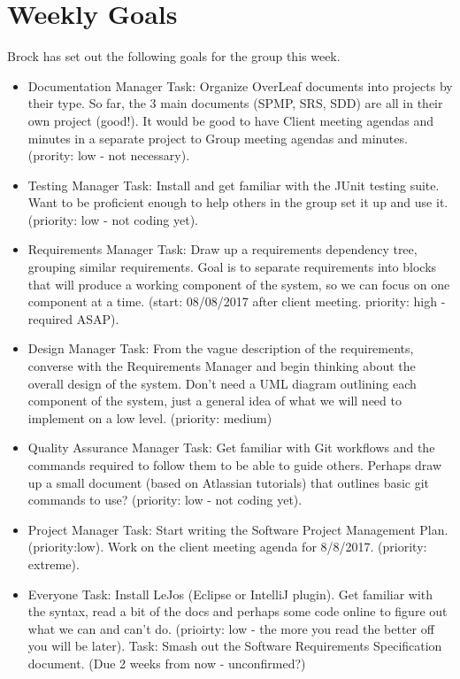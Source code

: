 \documentclass{article}
\begin{document}
\section{Weekly Goals}
Brock has set out the following goals for the group this week.
  \begin{itemize}
\item Documentation Manager
  \newline Task: Organize OverLeaf documents into projects by their type. So far, the 3 main documents (SPMP, SRS, SDD) are all in their own project (good!). It would be good to have Client meeting agendas and minutes in a separate project to Group meeting agendas and minutes. (prority: low - not necessary).
  \item Testing Manager
  \newline Task: Install and get familiar with the JUnit testing suite. Want to be proficient enough to help others in the group set it up and use it. (priority: low - not coding yet).
  \item Requirements Manager
  \newline Task: Draw up a requirements dependency tree, grouping similar requirements. Goal is to separate requirements into blocks that will produce a working component of the system, so we can focus on one component at a time. (start: 08/08/2017 after client meeting. priority: high - required ASAP).
  \item Design Manager
  \newline Task: From the vague description of the requirements, converse with the Requirements Manager and begin thinking about the overall design of the system. Don't need a UML diagram outlining each component of the system, just a general idea of what we will need to implement on a low level. (priority: medium)
  \item Quality Assurance Manager
  \newline Task: Get familiar with Git workflows and the commands required to follow them to be able to guide others. Perhaps draw up a small document (based on Atlassian tutorials) that outlines basic git commands to use? (priority: low - not coding yet).
  \item Project Manager
  \newline Task: Start writing the Software Project Management Plan. (priority:low). Work on the client meeting agenda for 8/8/2017. (priority: extreme).
  \item Everyone
  \newline Task: Install LeJos (Eclipse or IntelliJ plugin). Get familiar with the syntax, read a bit of the docs  and perhaps some code online to figure out what we can and can't do. (prioirty: low - the more you read the better off you will be later).
  \newline Task: Smash out the Software Requirements Specification document. (Due 2 weeks from now - unconfirmed?)
  \end{itemize}
\end{document}
